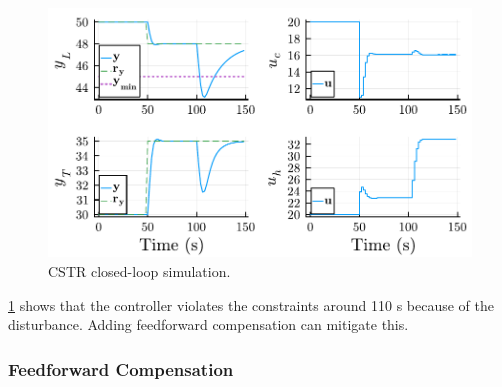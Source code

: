 \begin{figure}[h]
    \centering
    \includegraphics[width=\columnwidth]{fig/plot_LinMPC1.pdf}
    \caption{CSTR closed-loop simulation.}
    \label{fig:plot_LinMPC1}
\end{figure}

\cref{fig:plot_LinMPC1} shows that the controller violates the constraints around 110 s because of the disturbance. Adding feedforward compensation can mitigate this.

\subsubsection{Feedforward Compensation}

